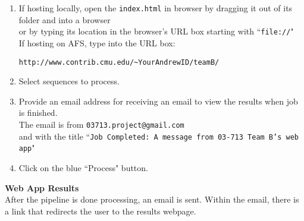 \documentclass[11pt]{article}
\begin{document}
\begin{enumerate}
	\item If hosting locally, open the \texttt{index.html} in browser by dragging it out of its folder and into a browser
	\\or by typing its location in the browser's URL box starting with ``\texttt{file://}"\\
	If hosting on AFS, type into the URL box:
	\begin{verbatim}http://www.contrib.cmu.edu/~YourAndrewID/teamB/
	\end{verbatim}
	\item Select sequences to process.
	\item Provide an email address for receiving an email to view the results when job is finished.\\
		The email is from \texttt{03713.project@gmail.com}\\
		and with the title ``\texttt{Job Completed: A message from 03-713 Team B's web app}"
	\item Click on the blue ``Process" button.
\end{enumerate}
\bigskip

\textbf{Web App Results}\\
After the pipeline is done processing, an email is sent. Within the email, there is a link that redirects the user to the results webpage.

\newpage
\begin{thebibliography}{9}

\end{thebibliography}
\end{document}
